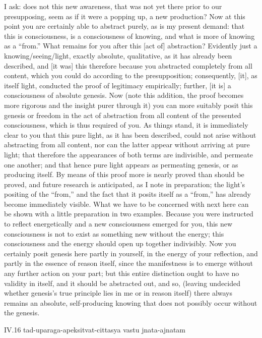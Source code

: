 I ask:
does not this new awareness,
that was not yet there prior to our presupposing,
seem as if it were a popping up, a new production?
Now at this point you are certainly able to abstract purely,
as is my present demand:
that this is consciousness,
is a consciousness of knowing,
and what is more of knowing as a “from.”
What remains for you after this [act of] abstraction?
Evidently just a knowing/seeing/light,
exactly absolute, qualitative, as it has already been described,
and [it was] this therefore because
you abstracted completely from all content,
which you could do according to the presupposition;
consequently, [it], as itself light, conducted
the proof of legitimacy empirically;
further, [it is] a consciousness of absolute genesis.
Now (note this addition, the proof becomes more rigorous
and the insight purer through it)
you can more suitably posit this genesis or freedom
in the act of abstraction from all content
of the presented consciousness,
which is thus required of you.
As things stand, it is immediately clear to you
that this pure light, as it has been described,
could not arise without abstracting from all content,
nor can the latter appear without arriving at pure light;
that therefore the appearances of both terms are indivisible,
and permeate one another;
and that hence pure light appears as permeating genesis,
or as producing itself.
By means of this proof more is
nearly proved than should be proved,
and future research is anticipated,
as I note in preparation;
the light's positing of the “from,”
and the fact that it posits itself as a “from,”
has already become immediately visible.
What we have to be concerned with next here
can be shown with a little preparation in two examples.
Because you were instructed to reflect energetically
and a new consciousness emerged for you,
this new consciousness is not to exist
as something new without the energy;
this consciousness and the energy should
open up together indivisibly.
Now you certainly posit genesis here
partly in yourself,
in the energy of your reflection,
and partly in the essence of reason itself,
since the manifestness is to emerge
without any further action on your part;
but this entire distinction ought to have no validity in itself,
and it should be abstracted out, and so,
(leaving undecided whether genesis's true principle
lies in me or in reason itself)
there always remains an absolute, self-producing knowing
that does not possibly occur without the genesis.

IV.16
tad-uparaga-apeksitvat-cittasya vastu jnata-ajnatam

